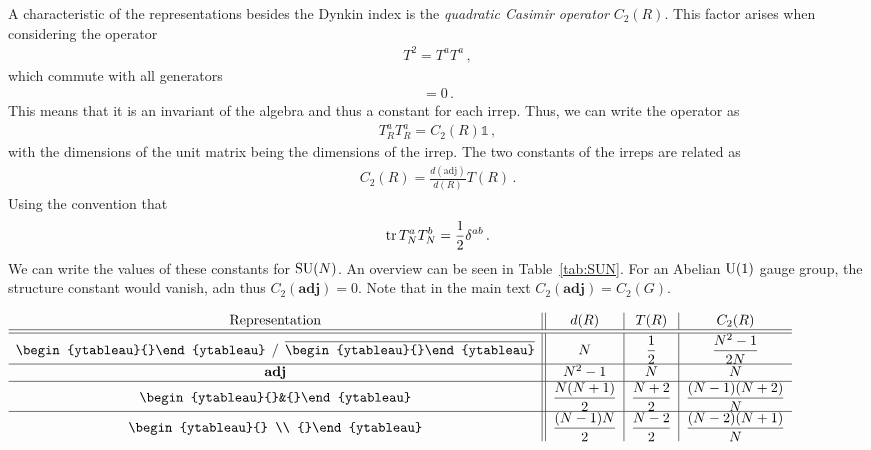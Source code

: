 A characteristic of the representations besides the Dynkin index is the  \textit{quadratic Casimir operator} $C_2(R)$. This factor arises when considering the operator
\begin{align}
    T^2=T^a T^a\,,
\end{align}
which commute with all generators
\begin{align}
    [T^2,T^b]=0\,.
\end{align}
This means that it is an invariant of the algebra and thus a constant for each irrep. Thus, we can write the operator as 
\begin{align}
    T^a_R T^a_R=C_2(R)\mathbb{1}\,,
\end{align}
with the dimensions of the unit matrix being the dimensions of the irrep. The two constants of the irreps are related as \cite{Peskin:1995ev}
\begin{align}
    C_2(R)=\frac{d(\text{adj})}{d(R)}T(R)\,.
\end{align}
Using the convention that 
\begin{equation}
    \operatorname{tr}{T^a_N T^b_N}=\frac{1}{2}\delta^{ab}\,.
    \label{eq: Dynkin index fund. rep}
\end{equation}
We can write the values of these constants for $\mathrm{SU}(N)$. An overview can be seen in Table~\ref{tab:SUN}. For an Abelian $\mathrm{U}(1)$ gauge group, the structure constant would vanish, adn thus $C_2(\textbf{adj})=0$. Note that in the main text $C_2(\textbf{adj})=C_2(G)$.
\begin{table}[h]
    \centering
    \renewcommand{\arraystretch}{2.2} %
    $
    \begin{array}{c||c|c|c} %
        \text{Representation} & d(R) & T(R) & C_2(R) \\
        \hline\hline
        \begin{ytableau}{}\end{ytableau} \,\;/\,\; \overline{\begin{ytableau}{}\end{ytableau}\rule{0pt}{7.5pt}} & N & \dfrac{1}{2} & \dfrac{N^2 - 1}{2N} \\
        \hline
        \mathbf{adj} & N^2 - 1 & N & N \\
        \hline
        \begin{ytableau}{}&{}\end{ytableau} & \dfrac{N(N+1)}{2} & \dfrac{N+2}{2} & \dfrac{(N-1)(N+2)}{N} \\
        \hline
        \begin{ytableau}{} \\ {}\end{ytableau} & \dfrac{(N-1)N}{2} & \dfrac{N-2}{2} & \dfrac{(N-2)(N+1)}{N} %
    \end{array}
    $
    \caption{Dimensions $d(R)$, Dynkin indices $T(R)$, and quadratic Casimir invariants $C_2(R)$ for the fundamental, adjoint, two-index symmetric, and two-index anti-symmetric representations.}
    \label{tab:SUN}
\end{table}

